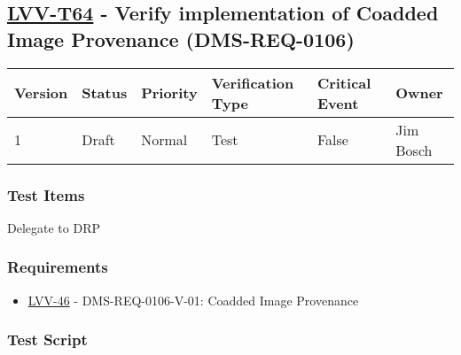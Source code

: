 \hypertarget{lvv-t64---verify-implementation-of-coadded-image-provenance-dms-req-0106}{%
\subsection{\texorpdfstring{\href{https://jira.lsstcorp.org/secure/Tests.jspa\#/testCase/LVV-T64}{LVV-T64}
- Verify implementation of Coadded Image Provenance
(DMS-REQ-0106)}{LVV-T64 - Verify implementation of Coadded Image Provenance (DMS-REQ-0106)}}\label{lvv-t64---verify-implementation-of-coadded-image-provenance-dms-req-0106}}

\begin{longtable}[]{@{}llllll@{}}
\toprule
Version & Status & Priority & Verification Type & Critical Event &
Owner\tabularnewline
\midrule
\endhead
1 & Draft & Normal & Test & False & Jim Bosch\tabularnewline
\bottomrule
\end{longtable}

\hypertarget{test-items-40}{%
\subsubsection{Test Items}\label{test-items-40}}

Delegate to DRP

\hypertarget{requirements-41}{%
\subsubsection{Requirements}\label{requirements-41}}

\begin{itemize}
\tightlist
\item
  \href{https://jira.lsstcorp.org/browse/LVV-46}{LVV-46} -
  DMS-REQ-0106-V-01: Coadded Image Provenance
\end{itemize}

\hypertarget{test-script-41}{%
\subsubsection{Test Script}\label{test-script-41}}

